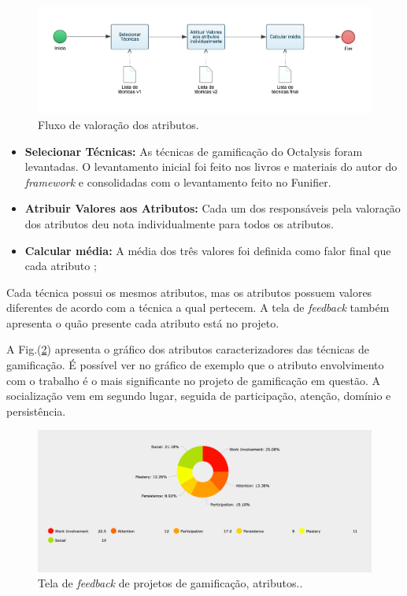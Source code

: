 \begin{figure}[h]
	\centering
		\includegraphics[keepaspectratio=true,scale=0.4]{figuras/fluxo.png}
	\caption{Fluxo de valoração dos atributos.\label{fig12}}
\end{figure}


\begin{itemize}
\item  \textbf {Selecionar Técnicas:} As técnicas de gamificação do Octalysis foram levantadas. O levantamento inicial foi feito nos livros e materiais do autor do \textit{framework} e consolidadas com o levantamento feito no Funifier.
\item  \textbf {Atribuir Valores aos Atributos:} Cada um dos responsáveis pela valoração dos atributos deu nota individualmente para todos os atributos. 
\item  \textbf {Calcular média:} A média dos três valores foi definida como falor final que cada atributo ;

\end{itemize}

Cada técnica possui os mesmos atributos, mas os atributos possuem valores diferentes de acordo com a técnica a qual pertecem. A tela de \textit{feedback} também apresenta o quão presente cada atributo está no projeto. 


A Fig.(\ref{fig13}) apresenta o gráfico dos atributos caracterizadores das técnicas de gamificação. É possível ver no gráfico de exemplo que o atributo envolvimento com o trabalho é o mais significante no projeto de gamificação em questão. A socialização vem em segundo lugar, seguida de participação, atenção, domínio e persistência.	


\begin{figure}[h]
	\centering
		\includegraphics[keepaspectratio=true,scale=0.35]{figuras/atributos.png}
	\caption{Tela de \textit{feedback} de projetos de gamificação, atributos..\label{fig13}}
\end{figure}


